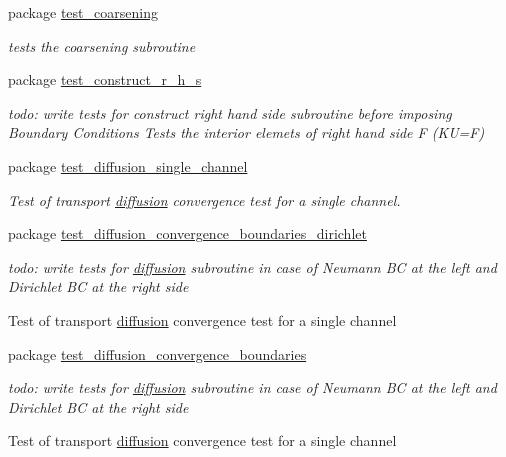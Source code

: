 \begin{CompactItemize}
\item 
package \hyperlink{a00077}{test\_\-coarsening}
\begin{CompactList}\small\item\em tests the coarsening subroutine \item\end{CompactList}

\item 
package \hyperlink{a00078}{test\_\-construct\_\-r\_\-h\_\-s}
\begin{CompactList}\small\item\em todo: write tests for construct right hand side subroutine before imposing Boundary Conditions Tests the interior elemets of right hand side F (KU=F) \item\end{CompactList}

\item 
package \hyperlink{a00082}{test\_\-diffusion\_\-single\_\-channel}
\begin{CompactList}\small\item\em Test of transport \hyperlink{a00056}{diffusion} convergence test for a single channel. \item\end{CompactList}

\item 
package \hyperlink{a00080}{test\_\-diffusion\_\-convergence\_\-boundaries\_\-dirichlet}
\begin{CompactList}\small\item\em todo: write tests for \hyperlink{a00056}{diffusion} subroutine in case of Neumann BC at the left and Dirichlet BC at the right side

Test of transport \hyperlink{a00056}{diffusion} convergence test for a single channel \item\end{CompactList}

\item 
package \hyperlink{a00079}{test\_\-diffusion\_\-convergence\_\-boundaries}
\begin{CompactList}\small\item\em todo: write tests for \hyperlink{a00056}{diffusion} subroutine in case of Neumann BC at the left and Dirichlet BC at the right side

Test of transport \hyperlink{a00056}{diffusion} convergence test for a single channel \item\end{CompactList}


\end{CompactItemize}
